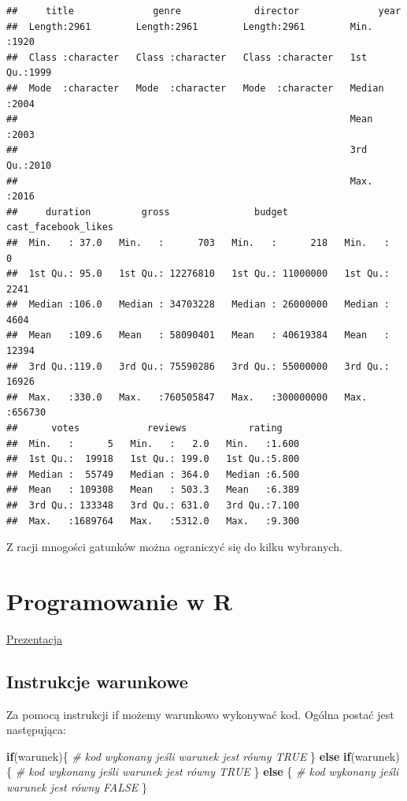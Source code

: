 \documentclass[
]{book}
\newenvironment{Shaded}{\begin{snugshade}}{\end{snugshade}}
\newcommand{\CommentTok}[1]{\textcolor[rgb]{0.56,0.35,0.01}{\textit{#1}}}
\newcommand{\ControlFlowTok}[1]{\textcolor[rgb]{0.13,0.29,0.53}{\textbf{#1}}}
\newcommand{\NormalTok}[1]{#1}
\begin{document}
\begin{verbatim}
##     title              genre             director              year     
##  Length:2961        Length:2961        Length:2961        Min.   :1920  
##  Class :character   Class :character   Class :character   1st Qu.:1999  
##  Mode  :character   Mode  :character   Mode  :character   Median :2004  
##                                                           Mean   :2003  
##                                                           3rd Qu.:2010  
##                                                           Max.   :2016  
##     duration         gross               budget          cast_facebook_likes
##  Min.   : 37.0   Min.   :      703   Min.   :      218   Min.   :     0     
##  1st Qu.: 95.0   1st Qu.: 12276810   1st Qu.: 11000000   1st Qu.:  2241     
##  Median :106.0   Median : 34703228   Median : 26000000   Median :  4604     
##  Mean   :109.6   Mean   : 58090401   Mean   : 40619384   Mean   : 12394     
##  3rd Qu.:119.0   3rd Qu.: 75590286   3rd Qu.: 55000000   3rd Qu.: 16926     
##  Max.   :330.0   Max.   :760505847   Max.   :300000000   Max.   :656730     
##      votes            reviews           rating     
##  Min.   :      5   Min.   :   2.0   Min.   :1.600  
##  1st Qu.:  19918   1st Qu.: 199.0   1st Qu.:5.800  
##  Median :  55749   Median : 364.0   Median :6.500  
##  Mean   : 109308   Mean   : 503.3   Mean   :6.389  
##  3rd Qu.: 133348   3rd Qu.: 631.0   3rd Qu.:7.100  
##  Max.   :1689764   Max.   :5312.0   Max.   :9.300
\end{verbatim}

Z racji mnogości gatunków można ograniczyć się do kilku wybranych.

\hypertarget{programowanie-w-r}{%
\chapter{Programowanie w R}\label{programowanie-w-r}}

\href{presentations/05_programowanie.html}{Prezentacja}

\hypertarget{instrukcje-warunkowe}{%
\section{Instrukcje warunkowe}\label{instrukcje-warunkowe}}

Za pomocą instrukcji if możemy warunkowo wykonywać kod. Ogólna postać jest następująca:

\begin{Shaded}
\begin{Highlighting}[]
\ControlFlowTok{if}\NormalTok{(warunek)\{}
  \CommentTok{\# kod wykonany jeśli warunek jest równy TRUE}
\NormalTok{\} }\ControlFlowTok{else} \ControlFlowTok{if}\NormalTok{(warunek) \{}
  \CommentTok{\# kod wykonany jeśli warunek jest równy TRUE}
\NormalTok{\} }\ControlFlowTok{else}\NormalTok{ \{}
  \CommentTok{\# kod wykonany jeśli warunek jest równy FALSE}
\NormalTok{\}}
\end{Highlighting}
\end{Shaded}
\end{document}
